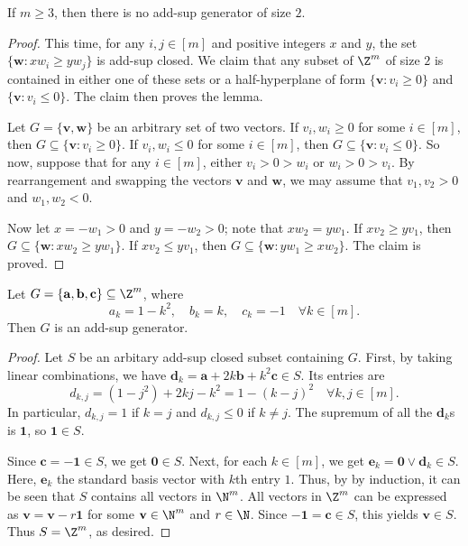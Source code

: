 \begin{lemma}\label{2022c7-3}
If $m \geq 3$, then there is no add-sup generator of size $2$.
\end{lemma}
\begin{proof}
This time, for any $i, j \in [m]$ and positive integers $x$ and $y$, the set $\{\mathbf{w} : x w_i \geq y w_j\}$ is add-sup closed.
We claim that any subset of $\Z^m$ of size $2$ is contained in either one of these sets or a half-hyperplane of form $\{\mathbf{v} : v_i \geq 0\}$ and $\{\mathbf{v} : v_i \leq 0\}$.
The claim then proves the lemma.

Let $G = \{\mathbf{v}, \mathbf{w}\}$ be an arbitrary set of two vectors.
If $v_i, w_i \geq 0$ for some $i \in [m]$, then $G \subseteq \{\mathbf{v} : v_i \geq 0\}$.
If $v_i, w_i \leq 0$ for some $i \in [m]$, then $G \subseteq \{\mathbf{v} : v_i \leq 0\}$.
So now, suppose that for any $i \in [m]$, either $v_i > 0 > w_i$ or $w_i > 0 > v_i$.
By rearrangement and swapping the vectors $\mathbf{v}$ and $\mathbf{w}$, we may assume that $v_1, v_2 > 0$ and $w_1, w_2 < 0$.

Now let $x = -w_1 > 0$ and $y = -w_2 > 0$; note that $x w_2 = y w_1$.
If $x v_2 \geq y v_1$, then $G \subseteq \{\mathbf{w} : x w_2 \geq y w_1\}$.
If $x v_2 \leq y v_1$, then $G \subseteq \{\mathbf{w} : y w_1 \geq x w_2\}$.
The claim is proved.
\end{proof}

\begin{lemma}\label{2022c7-4}
Let $G = \{\mathbf{a}, \mathbf{b}, \mathbf{c}\} \subseteq \Z^m$, where
\[ a_k = 1 - k^2, \quad b_k = k, \quad c_k = -1 \quad \forall k \in [m]. \]
Then $G$ is an add-sup generator.
\end{lemma}
\begin{proof}
Let $S$ be an arbitary add-sup closed subset containing $G$.
First, by taking linear combinations, we have $\mathbf{d}_k = \mathbf{a} + 2k \mathbf{b} + k^2 \mathbf{c} \in S$.
Its entries are
\[ d_{k, j} = (1 - j^2) + 2kj - k^2 = 1 - (k - j)^2 \quad \forall k, j \in [m]. \]
In particular, $d_{k, j} = 1$ if $k = j$ and $d_{k, j} \leq 0$ if $k \neq j$.
The supremum of all the $\mathbf{d}_k$s is $\mathbf{1}$, so $\mathbf{1} \in S$.

Since $\mathbf{c} = -\mathbf{1} \in S$, we get $\mathbf{0} \in S$.
Next, for each $k \in [m]$, we get $\mathbf{e}_k = \mathbf{0} \vee \mathbf{d}_k \in S$.
Here, $\mathbf{e}_k$ the standard basis vector with $k$th entry $1$.
Thus, by by induction, it can be seen that $S$ contains all vectors in $\N^m$.
All vectors in $\Z^m$ can be expressed as $\mathbf{v} = \mathbf{v} - r \mathbf{1}$ for some $\mathbf{v} \in \N^m$ and $r \in \N$.
Since $-\mathbf{1} = \mathbf{c} \in S$, this yields $\mathbf{v} \in S$.
Thus $S = \Z^m$, as desired.
\end{proof}
